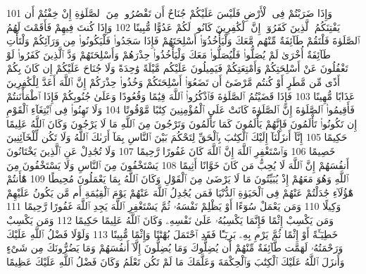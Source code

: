 {\tiny\colorbox{cl_aya}{101}} وَإِذَا ضَرَبْتُمْ فِى ٱلْأَرْضِ فَلَيْسَ عَلَيْكُمْ جُنَاحٌ أَن تَقْصُرُوا۟ مِنَ ٱلصَّلَوٰةِ إِنْ خِفْتُمْ أَن يَفْتِنَكُمُ ٱلَّذِينَ كَفَرُوٓا۟ إِنَّ ٱلْكَٰفِرِينَ كَانُوا۟ لَكُمْ عَدُوًّا مُّبِينًا
{\tiny\colorbox{cl_aya}{102}} وَإِذَا كُنتَ فِيهِمْ فَأَقَمْتَ لَهُمُ ٱلصَّلَوٰةَ فَلْتَقُمْ طَآئِفَةٌ مِّنْهُم مَّعَكَ وَلْيَأْخُذُوٓا۟ أَسْلِحَتَهُمْ فَإِذَا سَجَدُوا۟ فَلْيَكُونُوا۟ مِن وَرَآئِكُمْ وَلْتَأْتِ طَآئِفَةٌ أُخْرَىٰ لَمْ يُصَلُّوا۟ فَلْيُصَلُّوا۟ مَعَكَ وَلْيَأْخُذُوا۟ حِذْرَهُمْ وَأَسْلِحَتَهُمْ وَدَّ ٱلَّذِينَ كَفَرُوا۟ لَوْ تَغْفُلُونَ عَنْ أَسْلِحَتِكُمْ وَأَمْتِعَتِكُمْ فَيَمِيلُونَ عَلَيْكُم مَّيْلَةً وَٰحِدَةً وَلَا جُنَاحَ عَلَيْكُمْ إِن كَانَ بِكُمْ أَذًى مِّن مَّطَرٍ أَوْ كُنتُم مَّرْضَىٰٓ أَن تَضَعُوٓا۟ أَسْلِحَتَكُمْ وَخُذُوا۟ حِذْرَكُمْ إِنَّ ٱللَّهَ أَعَدَّ لِلْكَٰفِرِينَ عَذَابًا مُّهِينًا
{\tiny\colorbox{cl_aya}{103}} فَإِذَا قَضَيْتُمُ ٱلصَّلَوٰةَ فَٱذْكُرُوا۟ ٱللَّهَ قِيَٰمًا وَقُعُودًا وَعَلَىٰ جُنُوبِكُمْ فَإِذَا ٱطْمَأْنَنتُمْ فَأَقِيمُوا۟ ٱلصَّلَوٰةَ إِنَّ ٱلصَّلَوٰةَ كَانَتْ عَلَى ٱلْمُؤْمِنِينَ كِتَٰبًا مَّوْقُوتًا
{\tiny\colorbox{cl_aya}{104}} وَلَا تَهِنُوا۟ فِى ٱبْتِغَآءِ ٱلْقَوْمِ إِن تَكُونُوا۟ تَأْلَمُونَ فَإِنَّهُمْ يَأْلَمُونَ كَمَا تَأْلَمُونَ وَتَرْجُونَ مِنَ ٱللَّهِ مَا لَا يَرْجُونَ وَكَانَ ٱللَّهُ عَلِيمًا حَكِيمًا
{\tiny\colorbox{cl_aya}{105}} إِنَّآ أَنزَلْنَآ إِلَيْكَ ٱلْكِتَٰبَ بِٱلْحَقِّ لِتَحْكُمَ بَيْنَ ٱلنَّاسِ بِمَآ أَرَىٰكَ ٱللَّهُ وَلَا تَكُن لِّلْخَآئِنِينَ خَصِيمًا
{\tiny\colorbox{cl_aya}{106}} وَٱسْتَغْفِرِ ٱللَّهَ إِنَّ ٱللَّهَ كَانَ غَفُورًا رَّحِيمًا
{\tiny\colorbox{cl_aya}{107}} وَلَا تُجَٰدِلْ عَنِ ٱلَّذِينَ يَخْتَانُونَ أَنفُسَهُمْ إِنَّ ٱللَّهَ لَا يُحِبُّ مَن كَانَ خَوَّانًا أَثِيمًا
{\tiny\colorbox{cl_aya}{108}} يَسْتَخْفُونَ مِنَ ٱلنَّاسِ وَلَا يَسْتَخْفُونَ مِنَ ٱللَّهِ وَهُوَ مَعَهُمْ إِذْ يُبَيِّتُونَ مَا لَا يَرْضَىٰ مِنَ ٱلْقَوْلِ وَكَانَ ٱللَّهُ بِمَا يَعْمَلُونَ مُحِيطًا
{\tiny\colorbox{cl_aya}{109}} هَٰٓأَنتُمْ هَٰٓؤُلَآءِ جَٰدَلْتُمْ عَنْهُمْ فِى ٱلْحَيَوٰةِ ٱلدُّنْيَا فَمَن يُجَٰدِلُ ٱللَّهَ عَنْهُمْ يَوْمَ ٱلْقِيَٰمَةِ أَم مَّن يَكُونُ عَلَيْهِمْ وَكِيلًا
{\tiny\colorbox{cl_aya}{110}} وَمَن يَعْمَلْ سُوٓءًا أَوْ يَظْلِمْ نَفْسَهُۥ ثُمَّ يَسْتَغْفِرِ ٱللَّهَ يَجِدِ ٱللَّهَ غَفُورًا رَّحِيمًا
{\tiny\colorbox{cl_aya}{111}} وَمَن يَكْسِبْ إِثْمًا فَإِنَّمَا يَكْسِبُهُۥ عَلَىٰ نَفْسِهِۦ وَكَانَ ٱللَّهُ عَلِيمًا حَكِيمًا
{\tiny\colorbox{cl_aya}{112}} وَمَن يَكْسِبْ خَطِيٓـَٔةً أَوْ إِثْمًا ثُمَّ يَرْمِ بِهِۦ بَرِيٓـًٔا فَقَدِ ٱحْتَمَلَ بُهْتَٰنًا وَإِثْمًا مُّبِينًا
{\tiny\colorbox{cl_aya}{113}} وَلَوْلَا فَضْلُ ٱللَّهِ عَلَيْكَ وَرَحْمَتُهُۥ لَهَمَّت طَّآئِفَةٌ مِّنْهُمْ أَن يُضِلُّوكَ وَمَا يُضِلُّونَ إِلَّآ أَنفُسَهُمْ وَمَا يَضُرُّونَكَ مِن شَىْءٍ وَأَنزَلَ ٱللَّهُ عَلَيْكَ ٱلْكِتَٰبَ وَٱلْحِكْمَةَ وَعَلَّمَكَ مَا لَمْ تَكُن تَعْلَمُ وَكَانَ فَضْلُ ٱللَّهِ عَلَيْكَ عَظِيمًا
